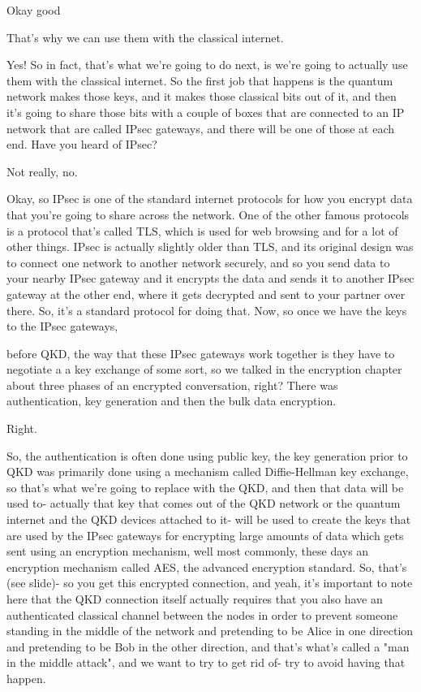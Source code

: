 Okay good

That's why we can use them with the classical internet.

Yes! So in fact, that's what we're going to do next, is we're going to actually use them with the classical internet. So the first job that happens is the quantum network makes those keys, and it makes those classical bits out of it, and then it's going to share those bits with a couple of boxes that are connected to an IP network that are called IPsec gateways, and there will be one of those at each end. Have you heard of IPsec?

Not really, no.

Okay, so IPsec is one of the standard internet protocols for how you encrypt data that you're going to share across the network. One of the other famous protocols is a protocol that's called TLS, which is used for web browsing and for a lot of other things. IPsec is actually slightly older than TLS, and its original design was to connect one network to another network securely, and so you send data to your nearby IPsec gateway and it encrypts the data and sends it to another IPsec gateway at the other end, where it gets decrypted and sent to your partner over there. So, it's a standard protocol for doing that. Now, so once we have the keys to the IPsec gateways,

before QKD, the way that these IPsec gateways work together is they have to negotiate a a key exchange of some sort, so we talked in the encryption chapter about three phases of an encrypted conversation, right? There was authentication, key generation and then the bulk data encryption.

Right.

So, the authentication is often done using public key, the key generation prior to QKD was primarily done using a mechanism called Diffie-Hellman key exchange, so that's what we're going to replace with the QKD, and then that data will be used to- actually that key that comes out of the QKD network or the quantum internet and the QKD devices attached to it- will be used to create the keys that are used by the IPsec gateways for encrypting large amounts of data which gets sent using an encryption mechanism, well most commonly, these days an encryption mechanism called AES, the advanced encryption standard. So, that's (see slide)- so you get this encrypted connection, and yeah, it's important to note here that the QKD connection itself actually requires that you also have an authenticated classical channel between the nodes in order to prevent someone standing in the middle of the network and pretending to be Alice in one direction and pretending to be Bob in the other direction, and that's what's called a "man in the middle attack", and we want to try to get rid of- try to avoid having that happen.

